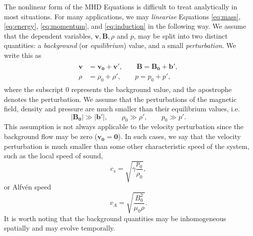 The nonlinear form of the MHD Equations is difficult to treat analytically in most situations.
For many applications, we may \textit{linearise} Equations \eqref{eq:mass}, \eqref{eq:energy}, \eqref{eq:momentum}, and \eqref{eq:induction} in the following way.
We assume that the dependent variables, $\mathbf{v}, \mathbf{B}, \rho$ and $p$, may be split into two distinct quantities: a \textit{background} (or \textit{equilibrium}) value, and a small \textit{perturbation}.
We write this as
%
\begin{align}
\begin{split}
\label{eq:perturbations}
\mathbf{v} & = \mathbf{v_0} + \mathbf{v'},
\qquad
\mathbf{B} = \mathbf{B_0} + \mathbf{b'},
\\
\rho & = \rho_0 + \rho',
\qquad
p = p_0 + p',
\end{split}
\end{align}
%
where the subscript $0$ represents the background value, and the apostrophe denotes the perturbation.
We assume that the perturbations of the magnetic field, density and pressure are much smaller than their equilibrium values, i.e.
%
\begin{equation}
| \mathbf{B_0} | \gg | \mathbf{b'} |,
\qquad
\rho_0 \gg \rho',
\qquad
p_0 \gg p'.
\end{equation}
%
This assumption is not always applicable to the velocity perturbation since the background flow may be zero ($\mathbf{v_0} = \mathbf 0$).
In such cases, we say that the velocity perturbation is much smaller than some other characteristic speed of the system, such as the local speed of sound,
%
\begin{equation}
\label{eq:soundspeed}
c_s = \sqrt{ \gamma \frac{p_0}{\rho_0} },
\end{equation}
%
or Alfv\'en speed
%
\begin{equation}
\label{eq:alfvenspeed}
v_A = \sqrt{ \frac{B_0^2}{\mu_0 \rho} }.
\end{equation}
%
It is worth noting that the background quantities may be inhomogeneous spatially and may evolve temporally.

